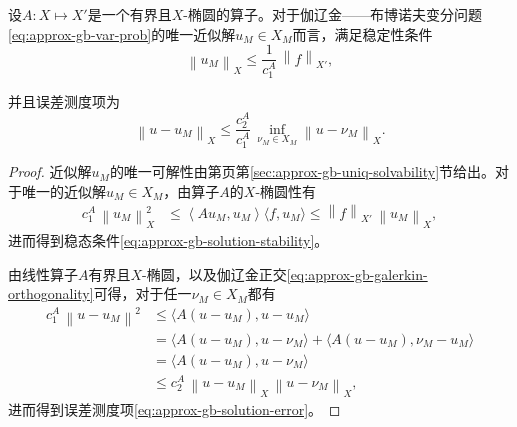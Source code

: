 \begin{theorem}[齐亚引理]
  \label{theorem:approx-cea-lemma}
  设$A:X \mapsto X'$是一个有界且$X$-椭圆的算子。对于伽辽金——布博诺夫变分问题\eqref{eq:approx-gb-var-prob}的唯一近似解$u_{M} \in X_{M}$而言，满足稳定性条件
  \begin{equation}
    \label{eq:approx-gb-solution-stability}
    \left\| u_{M} \right\|_{X} \le \frac{1}{c_{1}^{A}} \, \left\| f \right\|_{X'},
  \end{equation}

  并且误差测度项为
  \begin{equation}
    \label{eq:approx-gb-solution-error}
    \left\| u - u_{M} \right\|_{X}
    \le \frac{c_{2}^{A}}{c_{1}^{A}} \,
    \inf_{\nu_{M} \in X_{M}} \left\| u - \nu_{M} \right\|_{X}.
  \end{equation}
\end{theorem}
\begin{proof}
  近似解$u_{M}$的唯一可解性由第\pageref{sec:approx-gb-uniq-solvability}页第\ref{sec:approx-gb-uniq-solvability}节给出。对于唯一的近似解$u_{M} \in X_{M}$，由算子$A$的$X$-椭圆性有
\begin{equation*}
  \begin{split}
    c_{1}^{A} \, \left\| u_{M} \right\|_{X}^{2}
    & \le \left\langle
    A u_{M}, u_{M}
    \right\rangle \langle f, u_{M} \rangle
    \le \left\| f \right\|_{X'} \, \left\| u_{M} \right\|_{X},
  \end{split}
\end{equation*}
进而得到稳态条件\eqref{eq:approx-gb-solution-stability}。

由线性算子$A$有界且$X$-椭圆，以及伽辽金正交\eqref{eq:approx-gb-galerkin-orthogonality}可得，对于任一$\nu_{M} \in X_{M}$都有
\begin{equation*}
  \begin{split}
    c_{1}^{A} \, \left\| u - u_{M} \right\|^{2}
    & \le \langle A \left( u - u_{M} \right), u - u_{M} \rangle \\
    & = \langle
    A \left( u - u_{M} \right), u - \nu_{M}
    \rangle + \langle
    A \left( u - u_{M} \right), \nu_{M} - u_{M} \rangle \\
    & = \langle A \left( u - u_{M} \right), u - \nu_{M} \rangle \\
    & \le c_{2}^{A} \,
    \left\| u - u_{M} \right\|_{X} \,
    \left\| u - \nu_{M} \right\|_{X},
  \end{split}
\end{equation*}
进而得到误差测度项\eqref{eq:approx-gb-solution-error}。
\end{proof}

